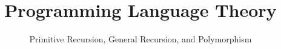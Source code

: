 
\usepackage{listings}
\title{Programming Language Theory}
\subtitle{Primitive Recursion, General Recursion, and Polymorphism}


{
\begin{frame}\maketitle\end{frame}}

%


